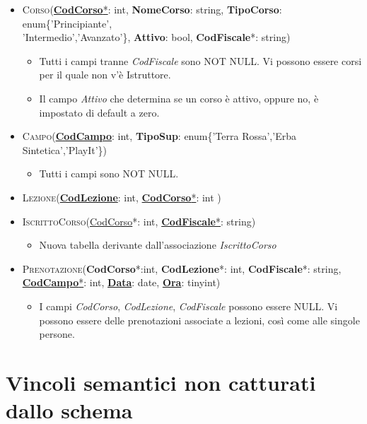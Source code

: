 \begin{itemize}
\item \textsc{Corso}(\underline{\textbf{CodCorso}*}: int, \textbf{NomeCorso}: string, \textbf{TipoCorso}: enum\{'Principiante',\\'Intermedio','Avanzato'\}, \textbf{Attivo}: bool, \textbf{CodFiscale}*: string)
\begin{itemize}
\item Tutti i campi tranne \textit{CodFiscale} sono NOT NULL. Vi possono essere corsi per il quale non v'è Istruttore.
\item Il campo \textit{Attivo} che determina se un corso è attivo, oppure no, è impostato di default a zero.
\end{itemize}
\item \textsc{Campo}(\underline{\textbf{CodCampo}}: int, \textbf{TipoSup}: enum\{'Terra Rossa','Erba Sintetica','PlayIt'\})
\begin{itemize}
\item Tutti i campi sono NOT NULL.
\end{itemize}

\item \textsc{Lezione}(\underline{\textbf{CodLezione}}: int, \underline{\textbf{CodCorso}*}: int )   
\item \textsc{IscrittoCorso}(\underline{CodCorso}*: int, \underline{\textbf{CodFiscale}*}: string) 
\begin{itemize}
\item Nuova tabella derivante dall'associazione \textit{IscrittoCorso}
\end{itemize}
\item \textsc{Prenotazione}(\textbf{CodCorso}*:int, \textbf{CodLezione}*: int, \textbf{CodFiscale}*: string, \underline{\textbf{CodCampo}*}: int, \underline{\textbf{Data}}: date, \underline{\textbf{Ora}}: tinyint)  
\begin{itemize}
\item I campi \textit{CodCorso}, \textit{CodLezione}, \textit{CodFiscale} possono essere NULL. Vi possono essere delle prenotazioni associate a lezioni, così come alle singole persone.
\end{itemize}
\end{itemize}

\section{Vincoli semantici non catturati dallo schema}
